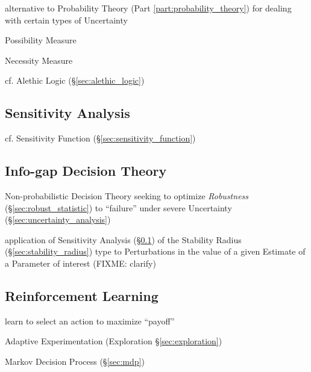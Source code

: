 alternative to Probability Theory (Part \ref{part:probability_theory}) for
dealing with certain types of Uncertainty

Possibility Measure

Necessity Measure

cf. Alethic Logic (\S\ref{sec:alethic_logic})



\subsection{Sensitivity Analysis}\label{sec:sensitivity_analysis}

cf. Sensitivity Function (\S\ref{sec:sensitivity_function})



\subsection{Info-gap Decision Theory}\label{sec:info_gap}

Non-probabilistic Decision Theory seeking to optimize \emph{Robustness}
(\S\ref{sec:robust_statistic}) to ``failure'' under severe Uncertainty
(\S\ref{sec:uncertainty_analysis})

application of Sensitivity Analysis (\S\ref{sec:sensitivity_analysis}) of the
Stability Radius (\S\ref{sec:stability_radius}) type to Perturbations in the
value of a given Estimate of a Parameter of interest (FIXME: clarify)



\subsection{Reinforcement Learning}\label{sec:reinforcement_learning}

learn to select an action to maximize ``payoff''

Adaptive Experimentation (Exploration \S\ref{sec:exploration})

Markov Decision Process (\S\ref{sec:mdp})

